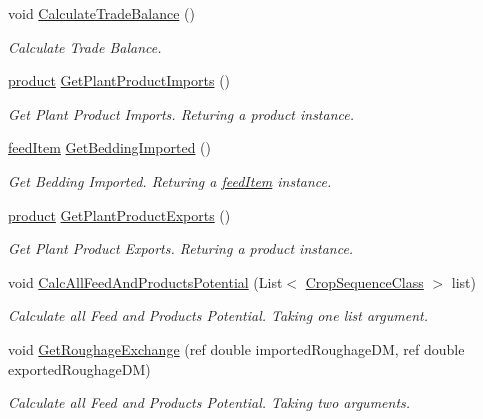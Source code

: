 \begin{DoxyCompactItemize}
void \mbox{\hyperlink{class_global_vars_a8829945aaadcc14efa19328c512c3a43}{Calculate\+Trade\+Balance}} ()
\begin{DoxyCompactList}\small\item\em Calculate Trade Balance. \end{DoxyCompactList}\item 
\mbox{\hyperlink{class_global_vars_1_1product}{product}} \mbox{\hyperlink{class_global_vars_a460ab7fc30f0bfd0ac2f70da9773c661}{Get\+Plant\+Product\+Imports}} ()
\begin{DoxyCompactList}\small\item\em Get Plant Product Imports. Returing a product instance. \end{DoxyCompactList}\item 
\mbox{\hyperlink{classfeed_item}{feed\+Item}} \mbox{\hyperlink{class_global_vars_a092e7eeb7bece400396938d44551a9f5}{Get\+Bedding\+Imported}} ()
\begin{DoxyCompactList}\small\item\em Get Bedding Imported. Returing a \mbox{\hyperlink{classfeed_item}{feed\+Item}} instance. \end{DoxyCompactList}\item 
\mbox{\hyperlink{class_global_vars_1_1product}{product}} \mbox{\hyperlink{class_global_vars_a97b9869100615c2e3b3fc5c48e10080f}{Get\+Plant\+Product\+Exports}} ()
\begin{DoxyCompactList}\small\item\em Get Plant Product Exports. Returing a product instance. \end{DoxyCompactList}\item 
void \mbox{\hyperlink{class_global_vars_ae96481c7f7db5cf25742d29ced57b3c0}{Calc\+All\+Feed\+And\+Products\+Potential}} (List$<$ \mbox{\hyperlink{class_crop_sequence_class}{Crop\+Sequence\+Class}} $>$ list)
\begin{DoxyCompactList}\small\item\em Calculate all Feed and Products Potential. Taking one list argument. \end{DoxyCompactList}\item 
void \mbox{\hyperlink{class_global_vars_a9ae8f3fa07b378ec836fa8519659f07e}{Get\+Roughage\+Exchange}} (ref double imported\+Roughage\+DM, ref double exported\+Roughage\+DM)
\begin{DoxyCompactList}\small\item\em Calculate all Feed and Products Potential. Taking two arguments. \end{DoxyCompactList}\item 

\end{DoxyCompactItemize}
